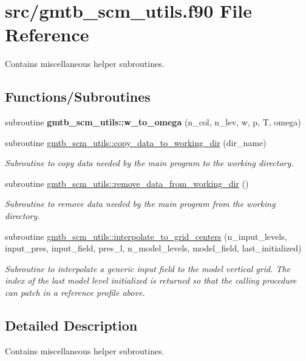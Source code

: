 \hypertarget{gmtb__scm__utils_8f90}{}\section{src/gmtb\+\_\+scm\+\_\+utils.f90 File Reference}
\label{gmtb__scm__utils_8f90}


Contains miscellaneous helper subroutines.  


\subsection*{Functions/\+Subroutines}
\begin{DoxyCompactItemize}
\item 
subroutine {\bfseries gmtb\+\_\+scm\+\_\+utils\+::w\+\_\+to\+\_\+omega} (n\+\_\+col, n\+\_\+lev, w, p, T, omega)
\end{DoxyCompactItemize}
{\bf }\par
\begin{DoxyCompactItemize}
\item 
subroutine \hyperlink{group__utils_gabb63e1dee42e85425c1a636a6b5449b0}{gmtb\+\_\+scm\+\_\+utils\+::copy\+\_\+data\+\_\+to\+\_\+working\+\_\+dir} (dir\+\_\+name)
\begin{DoxyCompactList}\small\item\em Subroutine to copy data needed by the main program to the working directory. \end{DoxyCompactList}\item 
subroutine \hyperlink{group__utils_ga86425fa83391b0ce1719fa1def3d46e5}{gmtb\+\_\+scm\+\_\+utils\+::remove\+\_\+data\+\_\+from\+\_\+working\+\_\+dir} ()
\begin{DoxyCompactList}\small\item\em Subroutine to remove data needed by the main program from the working directory. \end{DoxyCompactList}\item 
subroutine \hyperlink{group__utils_gadaa5d6afea19af5a67f29f4cde5a94af}{gmtb\+\_\+scm\+\_\+utils\+::interpolate\+\_\+to\+\_\+grid\+\_\+centers} (n\+\_\+input\+\_\+levels, input\+\_\+pres, input\+\_\+field, pres\+\_\+l, n\+\_\+model\+\_\+levels, model\+\_\+field,   last\+\_\+initialized)
\begin{DoxyCompactList}\small\item\em Subroutine to interpolate a generic input field to the model vertical grid. The index of the last model level initialized is returned so that the calling procedure can patch in a reference profile above. \end{DoxyCompactList}\end{DoxyCompactItemize}



\subsection{Detailed Description}
Contains miscellaneous helper subroutines. 


